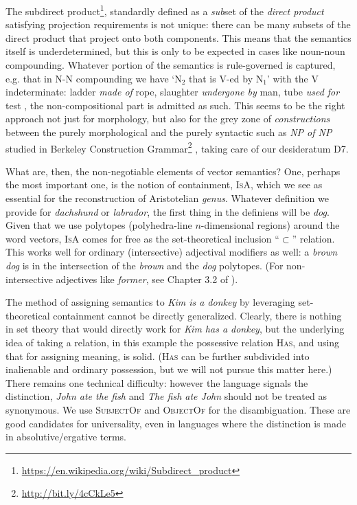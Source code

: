 \documentclass[output=paper]{langscibook}
\begin{document}
The subdirect product\footnote{\url{https://en.wikipedia.org/wiki/Subdirect_product}},
standardly defined as a \textit{sub}set of the \textit{direct product} satisfying
projection requirements is not unique: there can be many subsets of the direct
product that project onto both components. This means that the semantics
itself is underdetermined, but this is only to be expected in cases like
noun-noun compounding. Whatever portion of the semantics is rule-governed is
captured, e.g. that in N-N compounding we have `N$_2$ that is V-ed by N$_1$'
with the V indeterminate: ladder \textit{made of} rope, slaughter \textit{undergone
  by} man, tube \textit{used for} test \citep{Kiparsky:1982b}, the
non-compositional part is admitted as such. This seems to be the right approach
not just for morphology, but also for the grey zone of \textit{constructions}
between the purely morphological and the purely syntactic such as \textit{NP of
  NP} studied in Berkeley Construction Grammar\footnote{\url{http://bit.ly/4cCkLe5} } \citep{Kornai:1988a}, taking care of our desideratum
D7.

What are, then, the non-negotiable elements of vector
semantics? One, perhaps the most important one, is the notion of containment,
\textsc{IsA}, which we see as essential for the reconstruction of Aristotelian
\textit{genus}. Whatever definition we provide for \textit{dachshund} or \textit{labrador}, the first thing in the definiens will be \textit{dog}. Given that we
use polytopes (polyhedra-line $n$-dimensional regions) around the word
vectors, \textsc{IsA} comes for free as the set-theoretical inclusion “$\subset$”
relation. This works well for ordinary (intersective) adjectival modifiers
as well: a \textit{brown dog} is in the intersection of the \textit{brown} and the
\textit{dog} polytopes. (For non-intersective adjectives like \textit{former}, see
Chapter 3.2 of \cite{Kornai:2022}).

The method of assigning semantics to \textit{Kim is a donkey} by leveraging
set-theo\-ret\-ical containment cannot be directly generalized.  Clearly,
there is nothing in set theory that would directly work for \textit{Kim has a
  donkey}, but the underlying idea of taking a relation, in this example the
possessive relation \textsc{Has}, and using that for assigning meaning, is
solid. (\textsc{Has} can be further subdivided into inalienable and ordinary
possession, but we will not pursue this matter here.) There remains one
technical difficulty: however the language signals the distinction, \textit{John
  ate the fish} and \textit{The fish ate John} should not be treated as
synonymous. We use \textsc{SubjectOf} and \textsc{ObjectOf} for the
disambiguation. These are good candidates for universality, even in languages
where the distinction is made in absolutive/ergative terms.
\end{document}

